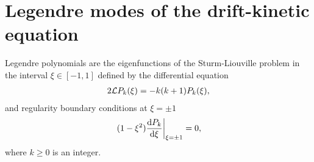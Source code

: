 \section{Legendre modes of the drift-kinetic equation}\label{sec:Appendix_Legendre}

Legendre polynomials are the eigenfunctions of the Sturm-Liouville problem in the interval $\xi\in[-1,1]$ defined by the differential equation%
\begin{align}
	2\mathcal{L} P_k(\xi) = -k(k+1) P_k(\xi), \label{eq:Legendre_eigenvalues}
\end{align}
and regularity boundary conditions at $\xi = \pm 1 $
%
\begin{align}
	\eval{(1-\xi^2)\dv{P_k}{\xi}}_{\xi = \pm 1} = 0,
\end{align}
where $k\ge 0$ is an integer. 

